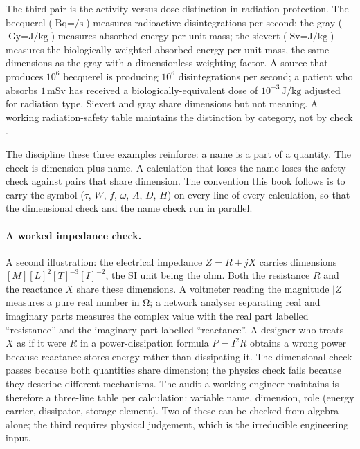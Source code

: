 The third pair is the activity-versus-dose distinction in
radiation protection. The becquerel ($\si{\becquerel} =
\si{\per\second}$) measures radioactive disintegrations per second;
the gray ($\si{\gray} = \si{\joule\per\kilogram}$) measures absorbed
energy per unit mass; the sievert ($\si{\sievert} =
\si{\joule\per\kilogram}$) measures the biologically-weighted
absorbed energy per unit mass, the same dimensions as the gray with
a dimensionless weighting factor. A source that produces
$10^{6}$ becquerel is producing $10^{6}$ disintegrations per second;
a patient who absorbs $1 \,\si{\milli\sievert}$ has received a
biologically-equivalent dose of $10^{-3} \,\si{\joule\per\kilogram}$
adjusted for radiation type. Sievert and gray share dimensions but
not meaning. A working radiation-safety table maintains the
distinction by category, not by check
\cite[appendix~5]{std:bipm-si2019}.

The discipline these three examples reinforce: a name is a part of
a quantity. The check is dimension plus name. A calculation that
loses the name loses the safety check against pairs that share
dimension. The convention this book follows is to carry the symbol
($\tau$, $W$, $f$, $\omega$, $A$, $D$, $H$) on every line of every
calculation, so that the dimensional check and the name check run
in parallel.

\paragraph{A worked impedance check.} A second illustration: the
electrical impedance $Z = R + jX$ carries dimensions
$[M][L]^{2}[T]^{-3}[I]^{-2}$, the SI unit being the ohm. Both the
resistance $R$ and the reactance $X$ share these dimensions. A
voltmeter reading the magnitude $|Z|$ measures a pure real number
in $\si{\ohm}$; a network analyser separating real and imaginary
parts measures the complex value with the real part labelled
``resistance'' and the imaginary part labelled ``reactance''. A
designer who treats $X$ as if it were $R$ in a power-dissipation
formula $P = I^{2} R$ obtains a wrong power because reactance
stores energy rather than dissipating it. The dimensional check
passes because both quantities share dimension; the physics check
fails because they describe different mechanisms. The audit a
working engineer maintains is therefore a three-line table per
calculation: variable name, dimension, role (energy carrier,
dissipator, storage element). Two of these can be checked from
algebra alone; the third requires physical judgement, which is
the irreducible engineering input.

